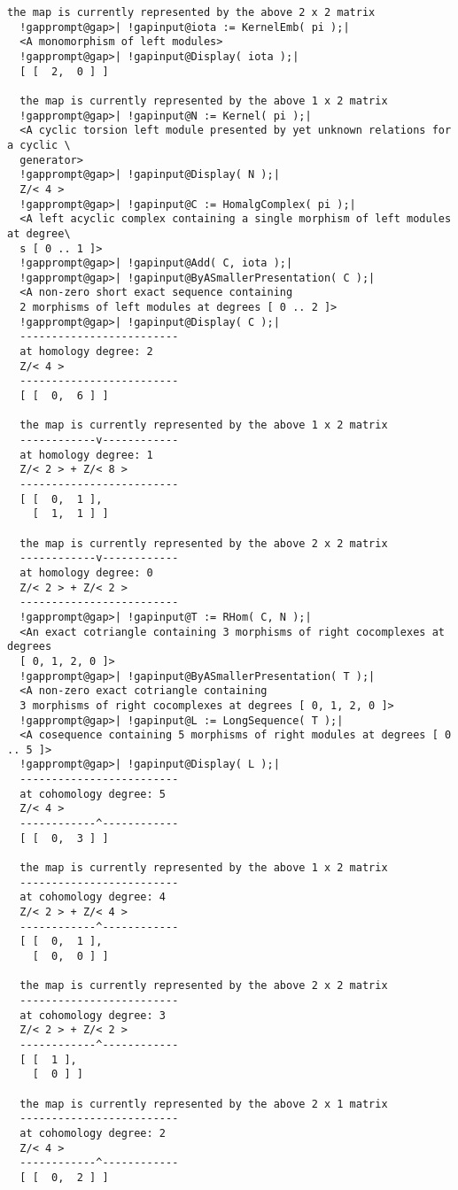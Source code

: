 \documentclass[a4paper,11pt]{report}
\begin{document}
{{{\begin{Verbatim}[commandchars=!@|,fontsize=\small,frame=single,label=Example]
  the map is currently represented by the above 2 x 2 matrix
  !gapprompt@gap>| !gapinput@iota := KernelEmb( pi );|
  <A monomorphism of left modules>
  !gapprompt@gap>| !gapinput@Display( iota );|
  [ [  2,  0 ] ]
  
  the map is currently represented by the above 1 x 2 matrix
  !gapprompt@gap>| !gapinput@N := Kernel( pi );|
  <A cyclic torsion left module presented by yet unknown relations for a cyclic \
  generator>
  !gapprompt@gap>| !gapinput@Display( N );|
  Z/< 4 >
  !gapprompt@gap>| !gapinput@C := HomalgComplex( pi );|
  <A left acyclic complex containing a single morphism of left modules at degree\
  s [ 0 .. 1 ]>
  !gapprompt@gap>| !gapinput@Add( C, iota );|
  !gapprompt@gap>| !gapinput@ByASmallerPresentation( C );|
  <A non-zero short exact sequence containing
  2 morphisms of left modules at degrees [ 0 .. 2 ]>
  !gapprompt@gap>| !gapinput@Display( C );|
  -------------------------
  at homology degree: 2
  Z/< 4 >
  -------------------------
  [ [  0,  6 ] ]
  
  the map is currently represented by the above 1 x 2 matrix
  ------------v------------
  at homology degree: 1
  Z/< 2 > + Z/< 8 >
  -------------------------
  [ [  0,  1 ],
    [  1,  1 ] ]
  
  the map is currently represented by the above 2 x 2 matrix
  ------------v------------
  at homology degree: 0
  Z/< 2 > + Z/< 2 >
  -------------------------
  !gapprompt@gap>| !gapinput@T := RHom( C, N );|
  <An exact cotriangle containing 3 morphisms of right cocomplexes at degrees
  [ 0, 1, 2, 0 ]>
  !gapprompt@gap>| !gapinput@ByASmallerPresentation( T );|
  <A non-zero exact cotriangle containing
  3 morphisms of right cocomplexes at degrees [ 0, 1, 2, 0 ]>
  !gapprompt@gap>| !gapinput@L := LongSequence( T );|
  <A cosequence containing 5 morphisms of right modules at degrees [ 0 .. 5 ]>
  !gapprompt@gap>| !gapinput@Display( L );|
  -------------------------
  at cohomology degree: 5
  Z/< 4 >
  ------------^------------
  [ [  0,  3 ] ]
  
  the map is currently represented by the above 1 x 2 matrix
  -------------------------
  at cohomology degree: 4
  Z/< 2 > + Z/< 4 >
  ------------^------------
  [ [  0,  1 ],
    [  0,  0 ] ]
  
  the map is currently represented by the above 2 x 2 matrix
  -------------------------
  at cohomology degree: 3
  Z/< 2 > + Z/< 2 >
  ------------^------------
  [ [  1 ],
    [  0 ] ]
  
  the map is currently represented by the above 2 x 1 matrix
  -------------------------
  at cohomology degree: 2
  Z/< 4 >
  ------------^------------
  [ [  0,  2 ] ]
  

\end{Verbatim}}}}
\end{document}
